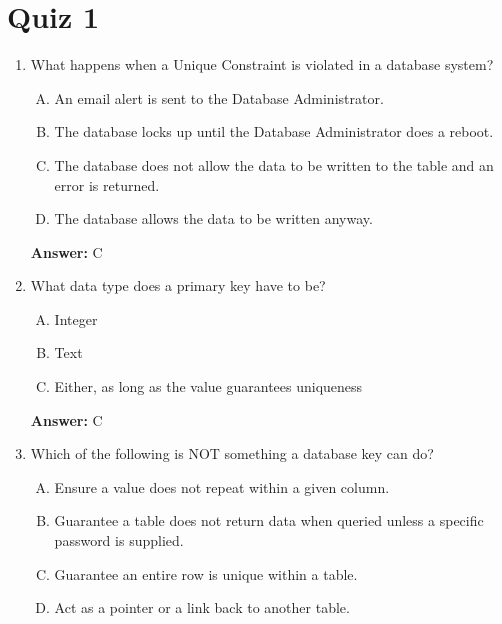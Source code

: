 \documentclass[12pt]{article}
\begin{document}
\bigskip

\section{Quiz 1}

\bigskip

\begin{enumerate}[1.]
    \item

    What happens when a Unique Constraint is violated in a database system?

    \bigskip

    \begin{enumerate}[A.]
        \item An email alert is sent to the Database Administrator.
        \item The database locks up until the Database Administrator does a reboot.
        \item The database does not allow the data to be written to the table and an error is returned.
        \item The database allows the data to be written anyway.
    \end{enumerate}

    \bigskip

    \textbf{Answer:} C

    \item

    What data type does a primary key have to be?

    \bigskip

    \begin{enumerate}[A.]
        \item Integer
        \item Text
        \item Either, as long as the value guarantees uniqueness
    \end{enumerate}

    \bigskip

    \textbf{Answer:} C

    \item

    Which of the following is NOT something a database key can do?

    \bigskip

    \begin{enumerate}[A.]
        \item Ensure a value does not repeat within a given column.
        \item Guarantee a table does not return data when queried unless a specific password is supplied.
        \item Guarantee an entire row is unique within a table.
        \item Act as a pointer or a link back to another table.
    \end{enumerate}


\end{enumerate}
\end{document}
